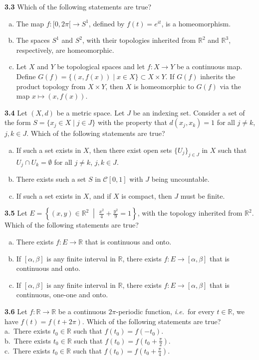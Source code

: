 \documentclass[11pt,a4paper]{article}
\newcommand{\R}{\mathbb{R}}
\newcommand{\qitem}[1]{\par\medskip\noindent\textbf{#1}\hspace{0.5em}}
\begin{document}
\qitem{3.3} Which of the following statements are true?
\begin{enumerate}[a.]
  \item The map $f : [0, 2\pi[ \to S^1$, defined by $f(t) = e^{it}$, is a homeomorphism.
  \item The spaces $S^1$ and $S^2$, with their topologies inherited from $\R^2$ and $\R^3$, respectively, are homeomorphic.
  \item Let $X$ and $Y$ be topological spaces and let $f : X \to Y$ be a continuous map. Define $G(f) = \{(x, f(x)) \mid x \in X\} \subset X \times Y$. If $G(f)$ inherits the product topology from $X \times Y$, then $X$ is homeomorphic to $G(f)$ via the map $x \mapsto (x, f(x))$.
\end{enumerate}

\qitem{3.4} Let $(X, d)$ be a metric space. Let $J$ be an indexing set. Consider a set of the form $S = \{x_j \in X \mid j \in J\}$ with the property that $d(x_j, x_k) = 1$ for all $j \neq k$, $j, k \in J$. Which of the following statements are true?
\begin{enumerate}[a.]
  \item If such a set exists in $X$, then there exist open sets $\{U_j\}_{j \in J}$ in $X$ such that $U_j \cap U_k = \emptyset$ for all $j \neq k$, $j, k \in J$.
  \item There exists such a set $S$ in $\mathcal{C}[0, 1]$ with $J$ being uncountable.
  \item If such a set exists in $X$, and if $X$ is compact, then $J$ must be finite.
\end{enumerate}

\qitem{3.5} Let $E = \left\{(x, y) \in \R^2 \;\middle|\; \frac{x^2}{4} + \frac{y^2}{9} = 1\right\}$, with the topology inherited from $\R^2$. Which of the following statements are true?
\begin{enumerate}[a.]
  \item There exists $f : E \to \R$ that is continuous and onto.
  \item If $[\alpha, \beta]$ is any finite interval in $\R$, there exists $f : E \to [\alpha, \beta]$ that is continuous and onto.
  \item If $[\alpha, \beta]$ is any finite interval in $\R$, there exists $f : E \to [\alpha, \beta]$ that is continuous, one-one and onto.
\end{enumerate}

\qitem{3.6} Let $f : \R \to \R$ be a continuous $2\pi$-periodic function, \emph{i.e.}\ for every $t \in \R$, we have $f(t) = f(t + 2\pi)$. Which of the following statements are true?\\
a.\ There exists $t_0 \in \R$ such that $f(t_0) = f(-t_0)$.\\
b.\ There exists $t_0 \in \R$ such that $f(t_0) = f(t_0 + \frac{\pi}{2})$.\\
c.\ There exists $t_0 \in \R$ such that $f(t_0) = f(t_0 + \frac{\pi}{4})$.
\end{document}
